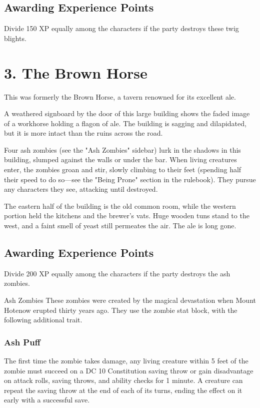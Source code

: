\documentclass[10pt,a4paper,twoside,bg=print,twocolumn,openany,nodeprecatedcode]{dndbook}
\begin{document}
\subsection{Awarding Experience Points}
Divide 150 XP equally among the characters if the party destroys these twig blights.

\section{3. The Brown Horse}
This was formerly the Brown Horse, a tavern renowned for its excellent ale.

\begin{DndReadAloud}{}
A weathered signboard by the door of this large building shows the faded image of a workhorse holding a flagon of ale. The building is sagging and dilapidated, but it is more intact than the ruins across the road.

\end{DndReadAloud}

Four ash zombies (see the "Ash Zombies" sidebar) lurk in the shadows in this building, slumped against the walls or under the bar. When living creatures enter, the zombies groan and stir, slowly climbing to their feet (spending half their speed to do so—see the "Being Prone" section in the rulebook). They pursue any characters they see, attacking until destroyed.

The eastern half of the building is the old common room, while the western portion held the kitchens and the brewer's vats. Huge wooden tuns stand to the west, and a faint smell of yeast still permeates the air. The ale is long gone.

\subsection{Awarding Experience Points}
Divide 200 XP equally among the characters if the party destroys the ash zombies.

\begin{DndSidebar}[float=!b]{Ash Zombies}
These zombies were created by the magical devastation when Mount Hotenow erupted thirty years ago. They use the zombie stat block, with the following additional trait.



\subsubsection{Ash Puff}
The first time the zombie takes damage, any living creature within 5 feet of the zombie must succeed on a DC 10 Constitution saving throw or gain disadvantage on attack rolls, saving throws, and ability checks for 1 minute. A creature can repeat the saving throw at the end of each of its turns, ending the effect on it early with a successful save.



\end{DndSidebar}
\end{document}
